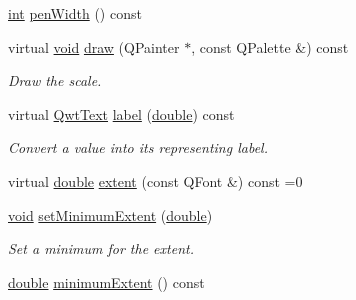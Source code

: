 \begin{DoxyCompactItemize}
\hyperlink{ioapi_8h_a787fa3cf048117ba7123753c1e74fcd6}{int} \hyperlink{class_qwt_abstract_scale_draw_a8933b8da6332a6d4badfa83e67b74865}{pen\-Width} () const 
\item 
virtual \hyperlink{group___u_a_v_objects_plugin_ga444cf2ff3f0ecbe028adce838d373f5c}{void} \hyperlink{class_qwt_abstract_scale_draw_aca3c3a7499112f52616d0ee8518fa5a6}{draw} (Q\-Painter $\ast$, const Q\-Palette \&) const 
\begin{DoxyCompactList}\small\item\em Draw the scale. \end{DoxyCompactList}\item 
virtual \hyperlink{class_qwt_text}{Qwt\-Text} \hyperlink{class_qwt_abstract_scale_draw_a4ff88bc827dd6c6ca9298de13483b61f}{label} (\hyperlink{_super_l_u_support_8h_a8956b2b9f49bf918deed98379d159ca7}{double}) const 
\begin{DoxyCompactList}\small\item\em Convert a value into its representing label. \end{DoxyCompactList}\item 
virtual \hyperlink{_super_l_u_support_8h_a8956b2b9f49bf918deed98379d159ca7}{double} \hyperlink{class_qwt_abstract_scale_draw_a1ac28ff3f13123bc6b67223a368c096f}{extent} (const Q\-Font \&) const =0
\item 
\hyperlink{group___u_a_v_objects_plugin_ga444cf2ff3f0ecbe028adce838d373f5c}{void} \hyperlink{class_qwt_abstract_scale_draw_ac174255c334b995ca010a6964597d5f2}{set\-Minimum\-Extent} (\hyperlink{_super_l_u_support_8h_a8956b2b9f49bf918deed98379d159ca7}{double})
\begin{DoxyCompactList}\small\item\em Set a minimum for the extent. \end{DoxyCompactList}\item 
\hyperlink{_super_l_u_support_8h_a8956b2b9f49bf918deed98379d159ca7}{double} \hyperlink{class_qwt_abstract_scale_draw_a563f102ef1370ecdfdc47133fb0c78ec}{minimum\-Extent} () const 
\end{DoxyCompactItemize}
